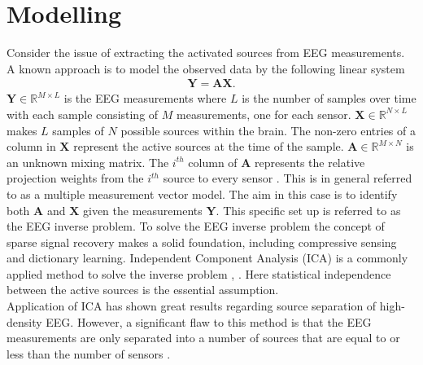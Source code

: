      


\section{Modelling}
Consider the issue of extracting the activated sources from EEG measurements. A known approach is to model the observed data by the following linear system 
\begin{align*}
\mathbf{Y} = \mathbf{AX}.
\end{align*}
$\mathbf{Y} \in \mathbb{R}^{M \times L}$ is the EEG measurements where $L$ is the number of samples over time with each sample consisting of $M$ measurements, one for each sensor. $\mathbf{X} \in \mathbb{R}^{N \times L}$ makes $L$ samples of $N$ possible sources within the brain. The non-zero entries of a column in $\textbf{X}$ represent the active sources at the time of the sample. $\mathbf{A} \in \mathbb{R}^{M \times N}$ is an unknown mixing matrix. 
The $i^{th}$ column of $\mathbf{A}$ represents the relative projection weights from the $i^{th}$ source to every sensor \cite{phd2015}. 
This is in general referred to as a multiple measurement vector model. 
The aim in this case is to identify both $\mathbf{A}$ and $\mathbf{X}$ given the measurements $\mathbf{Y}$. 
This specific set up is referred to as the EEG inverse problem.  
To solve the EEG inverse problem the concept of sparse signal recovery makes a solid foundation, including compressive sensing and dictionary learning. 
Independent Component Analysis (ICA) is a commonly applied method to solve the inverse problem \cite{Scott1996}, \cite{Scott1997}. Here statistical independence between the active sources is the essential assumption. 
\\
Application of ICA has shown great results regarding source separation of high-density EEG. 
However, a significant flaw to this method is that the EEG measurements are only separated into a number of sources that are equal to or less than the number of sensors \cite{Balkan2015}.
